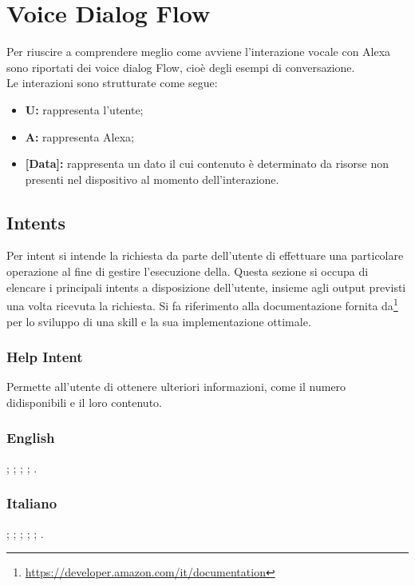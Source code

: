 \section{Voice Dialog Flow}
\label{VDF}
Per riuscire a comprendere meglio come avviene l'interazione vocale con Alexa sono riportati dei voice dialog Flow, cioè degli esempi di conversazione.\\

Le interazioni sono strutturate come segue:
\begin{itemize}
	\item \textbf{U:} rappresenta l'utente;
	\item \textbf{A:} rappresenta Alexa;
	\item \textbf{[Data]:} rappresenta un dato il cui contenuto è determinato da risorse non presenti nel dispositivo al momento dell'interazione.
\end{itemize}

\subsection{Intents}
Per intent si intende la richiesta da parte dell'utente di effettuare una particolare operazione al fine di gestire l'esecuzione della. 
Questa sezione si occupa di elencare i principali intents a disposizione dell'utente, insieme agli output previsti una volta ricevuta la richiesta.
Si fa riferimento alla documentazione fornita da\footnote{\url{https://developer.amazon.com/it/documentation}} per lo sviluppo di una skill e la sua implementazione ottimale.

\subsubsection{Help Intent}\label{help}
Permette all'utente di ottenere ulteriori informazioni, come il numero didisponibili e il loro contenuto.
\subsubsection{English}
\begin{itemize}
	;
	;
	;
	;
	.	
\end{itemize}
\subsubsection{Italiano}
\begin{itemize}
	;
	;
	;
	;
	;
	.
\end{itemize}

